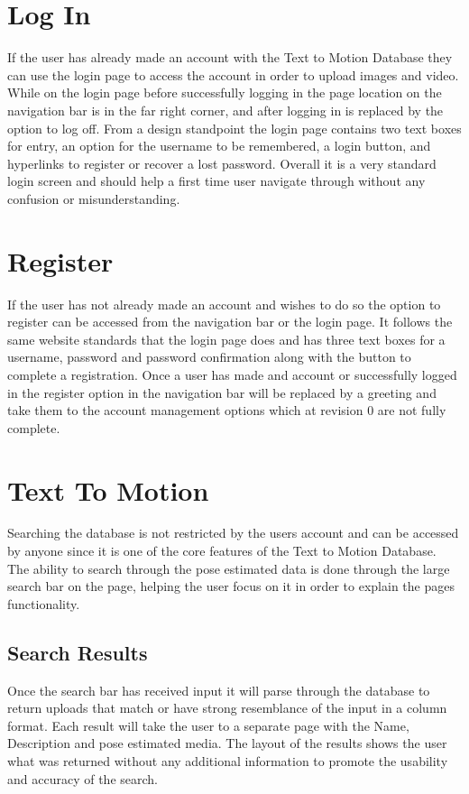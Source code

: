 \documentclass{scrreprt}
\begin{document}
\section{Log In}
If the user has already made an account with the Text to Motion Database they can use the login page to access the account in order to upload images and video. While on the login page before successfully logging in the page location on the navigation bar is in the far right corner, and after logging in is replaced by the option to log off.
From a design standpoint the login page contains two text boxes for entry, an option for the username to be remembered, a login button, and hyperlinks to register or recover a lost password. Overall it is a very standard login screen and should help a first time user navigate through without any confusion or misunderstanding.

\section{Register}
If the user has not already made an account and wishes to do so the option to register can be accessed from the navigation bar or the login page. It follows the same website standards that the login page does and has three text boxes for a username, password and password confirmation along with the button to complete a registration. Once a user has made and account or successfully logged in the register option in the navigation bar will be replaced by a greeting and take them to the account management options which at revision 0 are not fully complete.

\section{Text To Motion}
Searching the database is not restricted by the users account and can be accessed by anyone since it is one of the core features of the Text to Motion Database. The ability to search through the pose estimated data is done through the large search bar on the page, helping the user focus on it in order to explain the pages functionality.

\subsection{Search Results}
Once the search bar has received input it will parse through the database to return uploads that match or have strong resemblance of the input in a column format. Each result will take the user to a separate page with the Name, Description and pose estimated media. The layout of the results shows the user what was returned without any additional information to promote the usability and accuracy of the search.
\end{document}
